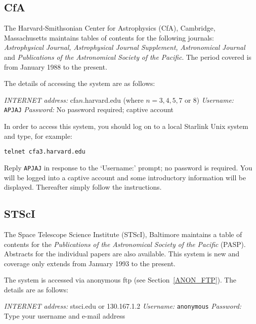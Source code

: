 \documentclass[twoside,11pt,nolof]{starlink}
\begin{document}
\subsection{CfA}

The Harvard-Smithsonian Center for Astrophysics (CfA), Cambridge,
Massachusetts maintains tables of contents for the following journals:
\textit{Astrophysical Journal, Astrophysical Journal Supplement,
Astronomical Journal} and \textit{Publications of the Astronomical Society
of the Pacific}. The period covered is from January 1988 to the present.

The details of accessing the system are as follows:

\textit{INTERNET address:} cfa$n$.harvard.edu (where $n = 3, 4, 5, 7$ or
$8$)
\newline \textit{Username:} \verb-APJAJ-
\newline \textit{Password:} No password required; captive account

In order to access this system, you should log on to a local Starlink
Unix system and type, for example:

\vspace{2.0 mm}
\verb:telnet cfa3.harvard.edu:
\vspace{2.0 mm}

Reply \texttt{APJAJ} in response to the `Username:' prompt; no password is
required. You will be logged into a captive account and some
introductory information will be displayed. Thereafter simply follow
the instructions.

\subsection{STScI}

The Space Telescope Science Institute (STScI), Baltimore maintains a
table of contents for the \textit{Publications of the Astronomical
Society of the Pacific} (PASP). Abstracts for the individual papers are
also available. This system is new and coverage only extends from
January 1993 to the present.

The system is accessed via anonymous ftp (see Section~\ref{ANON_FTP}).
The details are as follows:

\textit{INTERNET address:} stsci.edu or 130.167.1.2
\newline \textit{Username:} \verb-anonymous-
\newline \textit{Password:} Type your username and e-mail address
\end{document}
